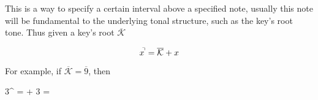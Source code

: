 \documentclass[preview]{standalone}
\begin{document}
\begin{center}
This is a way to specify a certain interval above a specified note, usually this note will be fundamental to the underlying tonal structure, such as the key's root tone. Thus given a key's root $ \overline{\mathcal{K}}$

	\[
	x^{\hspace{-0.1cm}\urcorner} = \overline{\mathcal{K}} + x
	\]

  For example, if $ \overline{\mathcal{K}} = \overline{9}$, then

	3^{\hspace{-0.1cm}\urcorner} =  + 3 = 
\end{center}
\end{document}
